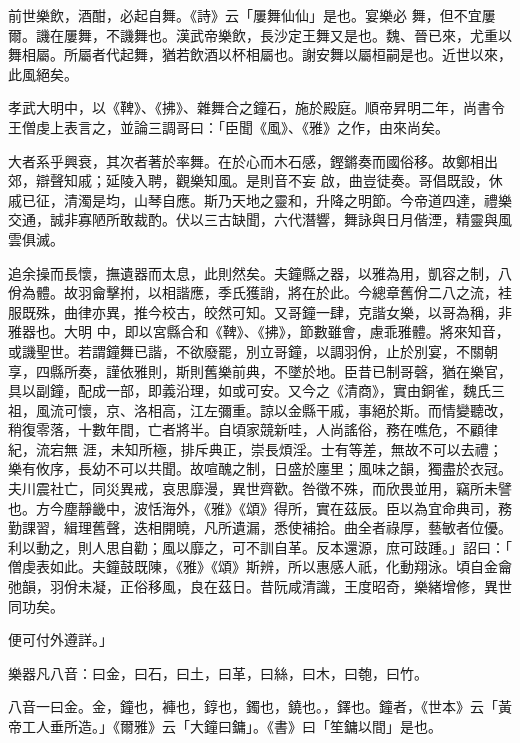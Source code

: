 \begin{pinyinscope}
 前世樂飲，酒酣，必起自舞。《詩》云「屢舞仙仙」是也。宴樂必
 舞，但不宜屢爾。譏在屢舞，不譏舞也。漢武帝樂飲，長沙定王舞又是也。魏、晉已來，尤重以舞相屬。所屬者代起舞，猶若飲酒以杯相屬也。謝安舞以屬桓嗣是也。近世以來，此風絕矣。



 孝武大明中，以《鞞》、《拂》、雜舞合之鐘石，施於殿庭。順帝昇明二年，尚書令王僧虔上表言之，並論三調哥曰：「臣聞《風》、《雅》之作，由來尚矣。



 大者系乎興衰，其次者著於率舞。在於心而木石感，鏗鏘奏而國俗移。故鄭相出郊，辯聲知戚；延陵入聘，觀樂知風。是則音不妄
 啟，曲豈徒奏。哥倡既設，休戚已征，清濁是均，山琴自應。斯乃天地之靈和，升降之明節。今帝道四達，禮樂交通，誠非寡陋所敢裁酌。伏以三古缺聞，六代潛響，舞詠與日月偕湮，精靈與風雲俱滅。



 追余操而長懷，撫遺器而太息，此則然矣。夫鐘縣之器，以雅為用，凱容之制，八佾為體。故羽龠擊拊，以相諧應，季氏獲誚，將在於此。今總章舊佾二八之流，袿服既殊，曲律亦異，推今校古，皎然可知。又哥鐘一肆，克諧女樂，以哥為稱，非雅器也。大明
 中，即以宮縣合和《鞞》、《拂》，節數雖會，慮乖雅體。將來知音，或譏聖世。若謂鐘舞已諧，不欲廢罷，別立哥鐘，以調羽佾，止於別宴，不關朝享，四縣所奏，謹依雅則，斯則舊樂前典，不墜於地。臣昔已制哥磬，猶在樂官，具以副鐘，配成一部，即義沿理，如或可安。又今之《清商》，實由銅雀，魏氏三祖，風流可懷，京、洛相高，江左彌重。諒以金縣干戚，事絕於斯。而情變聽改，稍復零落，十數年間，亡者將半。自頃家競新哇，人尚謠俗，務在噍危，不顧律紀，流宕無
 涯，未知所極，排斥典正，崇長煩淫。士有等差，無故不可以去禮；樂有攸序，長幼不可以共聞。故喧醜之制，日盛於廛里；風味之韻，獨盡於衣冠。夫川震社亡，同災異戒，哀思靡漫，異世齊歡。咎徵不殊，而欣畏並用，竊所未譬也。方今塵靜畿中，波恬海外，《雅》《頌》得所，實在茲辰。臣以為宜命典司，務勤課習，緝理舊聲，迭相開曉，凡所遺漏，悉使補拾。曲全者祿厚，藝敏者位優。利以動之，則人思自勸；風以靡之，可不訓自革。反本還源，庶可跂踵。」詔曰：「
 僧虔表如此。夫鐘鼓既陳，《雅》《頌》斯辨，所以惠感人祇，化動翔泳。頃自金龠弛韻，羽佾未凝，正俗移風，良在茲日。昔阮咸清識，王度昭奇，樂緒增修，異世同功矣。



 便可付外遵詳。」



 樂器凡八音：曰金，曰石，曰土，曰革，曰絲，曰木，曰匏，曰竹。



 八音一曰金。金，鐘也，褲也，錞也，鐲也，鐃也。，鐸也。鐘者，《世本》云「黃帝工人垂所造。」《爾雅》云「大鐘曰鏞」。《書》曰「笙鏞以間」是也。




\end{pinyinscope}
